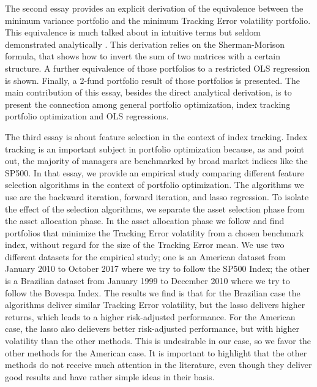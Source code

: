 \documentclass[12pt,oneside,a4paper]{memoir}
\begin{document}
The second essay provides an explicit derivation of the equivalence between the minimum variance portfolio and the minimum Tracking Error volatility portfolio.
This equivalence is much talked about in intuitive terms but seldom demonstrated analytically \cite{liu-2009, demol2016}.
This derivation relies on the Sherman-Morison formula, that shows how to invert the sum of two matrices with a certain structure.
A further equivalence of those portfolios to a restricted OLS regression is shown.
Finally, a 2-fund portfolio result of those portfolios is presented.
The main contribution of this essay, besides the direct analytical derivation, is to present the connection among general portfolio optimization, index tracking portfolio optimization and OLS regressions.

The third essay is about feature selection in the context of index tracking.
Index tracking is an important subject in portfolio optimization because, as  and  point out, the majority of managers are benchmarked by broad market indices like the SP500.
In that essay, we provide an empirical study comparing different feature selection algorithms in the context of portfolio optimization.
The algorithms we use are the backward iteration, forward iteration, and lasso regression.
To isolate the effect of the selection algorithms, we separate the asset selection phase from the asset allocation phase.
In the asset allocation phase we follow  and find portfolios that minimize the Tracking Error volatility from a chosen benchmark index, without regard for the size of the Tracking Error mean.
We use two different datasets for the empirical study; one is an American dataset from January 2010 to October 2017 where we try to follow the SP500 Index; the other is a Brazilian dataset from January 1999 to December 2010 where we try to follow the Bovespa Index.
The results we find is that for the Brazilian case the algorithms deliver similar Tracking Error volatility, but the lasso delivers higher returns, which leads to a higher risk-adjusted performance.
For the American case, the lasso also delievers better risk-adjusted performance, but with higher volatility than the other methods.
This is undesirable in our case, so we favor the other methods for the American case.
It is important to highlight that the other methods do not receive much attention in the literature, even though they deliver good results and have rather simple ideas in their basis.

\postextual


\renewcommand\bibname{REFERENCES}


\end{document}
